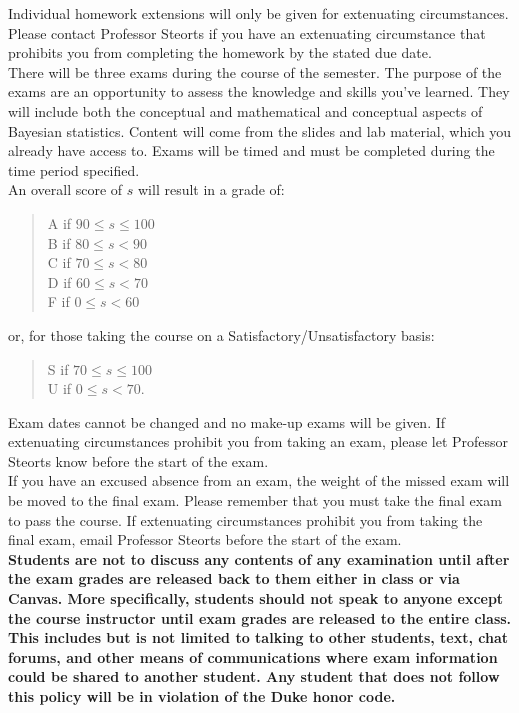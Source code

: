 \documentclass[11pt]{article}
\begin{document}
Individual homework extensions will only be given for extenuating circumstances. Please contact Professor Steorts if you have an extenuating circumstance that prohibits you from completing the homework by the stated due date.\\

There will be three exams during the course of the semester. The purpose of the exams are an opportunity to assess the knowledge and skills you’ve learned. They will include both the conceptual and mathematical and conceptual aspects of Bayesian statistics. Content will come from the slides and lab material, which you already have access to. Exams will be timed and must be completed during the time period specified. \\

An overall score of $s$ will result in a grade of:
\begin{quote}
A if $90\leq s\leq 100$ \\
B if $80\leq s < 90$ \\
C if $70\leq s < 80$ \\
D if $60\leq s < 70$ \\
F if $0\leq s < 60$
\end{quote}
or, for those taking the course on a Satisfactory/Unsatisfactory basis:
\begin{quote}
S if $70\leq s\leq 100$ \\
U if $0\leq s < 70$.
\end{quote}


Exam dates cannot be changed and no make-up exams will be given. If extenuating circumstances prohibit you from taking an exam, please let Professor Steorts know before the start of the exam.\\

If you have an excused absence from an exam, the weight of the missed exam will be moved to the final exam. Please remember that you must take the final exam to pass the course. If extenuating circumstances prohibit you from taking the final exam, email Professor Steorts before the start of the exam. \\

\textbf{Students are not to discuss any contents of any examination until after the exam grades are released back to them either in class or via Canvas. More specifically, students should not speak to anyone except the course instructor until exam grades are released to the entire class. This includes but is not limited to talking to other students, text, chat forums, and other means of communications where exam information could be shared to another student. Any student that does not follow this policy will be in violation of the Duke honor code.}\\
\end{document}

